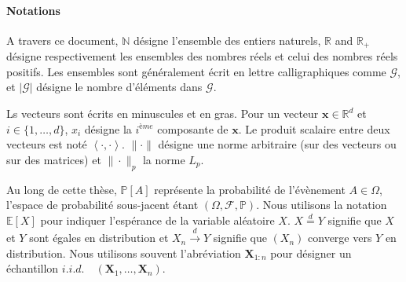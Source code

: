 \documentclass[a4paper, 12pt]{article}
\newcommand{\innerp}[1]{\left\langle #1 \right\rangle}
\newcommand\iid{\ensuremath{\mathit{i.i.d.}}\ }
\def\mb{\mathbf}
\def\P{\mathbb{P}}
\def\PP{\P}
\begin{document}
\paragraph{Notations}

A travers ce document, $\mathbb{N}$ désigne l'ensemble des entiers naturels, $\mathbb{R}$ and $\mathbb{R}_+$ désigne respectivement les ensembles des nombres réels et celui des nombres réels positifs. Les ensembles  sont généralement écrit en lettre calligraphiques comme $\mathcal{G}$, et $|\mathcal{G}|$ désigne le nombre d'éléments dans $\mathcal{G}$. 

Ls vecteurs sont écrits en minuscules et en gras. Pour un vecteur $\mathbf{x}\in\mathbb{R}^d$ et $i\in \{1,\dots,d\}$, $x_i$ désigne la $i^{ème}$ composante de $\mathbf{x}$. Le produit scalaire entre deux vecteurs est noté $\innerp{\cdot,\cdot}$. $\|\cdot\|$ désigne une norme arbitraire (sur des vecteurs ou sur des matrices) et $\|\cdot\|_p$ la norme $L_p$.

Au long de cette thèse, $\PP[A]$ représente la probabilité de l'évènement $A\in \Omega$, l'espace de probabilité sous-jacent étant $(\Omega, \mathcal{F}, \PP)$. Nous utilisons la notation $\mathbb{E}[X]$ pour indiquer l'espérance de la variable aléatoire $X$. $X \overset{d}{=} Y$ signifie que $X$ et $Y$ sont égales en distribution et $X_n \overset{d}{\to} Y$ signifie que $(X_n)$ converge vers $Y$ en distribution. Nous utilisons souvent l'abréviation $\mb X_{1:n}$ pour désigner un échantillon \iid~$(\mb X_1,\ldots,\mb X_n)$.

\end{document}
